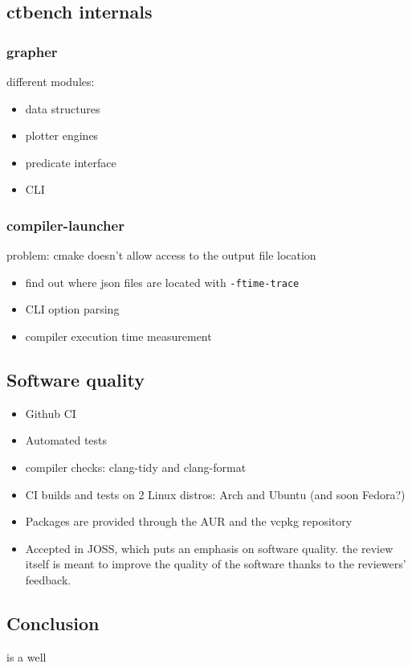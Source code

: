 \documentclass[../main]{subfiles}
\begin{document}
\subsection{
  ctbench internals
}

\subsubsection{
  grapher
}

different modules:

\begin{itemize}
\item data structures
\item plotter engines
\item predicate interface
\item CLI
\end{itemize}

\subsubsection{
  compiler-launcher
}

problem: cmake doesn't allow access to the output file location

\begin{itemize}
\item find out where json files are located with \lstinline{-ftime-trace}
\item CLI option parsing
\item compiler execution time measurement
\end{itemize}

\subsection{
  Software quality
}

\begin{itemize}
\item Github CI
\item Automated tests
\item compiler checks: clang-tidy and clang-format
\item CI builds and tests on 2 Linux distros: Arch and Ubuntu (and soon Fedora?)
\item Packages are provided through the AUR and the vcpkg repository
\item Accepted in JOSS, which puts an emphasis on software quality.
      the review itself is meant to improve the quality of the software
      thanks to the reviewers' feedback.
\end{itemize}

\subsection{
  Conclusion
}

\ctbench is a well
\end{document}
